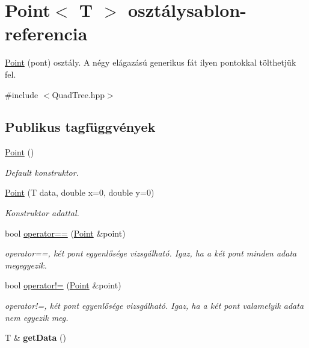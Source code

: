 \hypertarget{class_point}{\section{Point$<$ T $>$ osztálysablon-\/referencia}
\label{class_point}
}


\hyperlink{class_point}{Point} (pont) osztály. A négy elágazású generikus fát ilyen pontokkal tölthetjük fel.  




{\ttfamily \#include $<$Quad\-Tree.\-hpp$>$}

\subsection*{Publikus tagfüggvények}
\begin{DoxyCompactItemize}
\item 
\hypertarget{class_point_aea76b1130f1a203722d8f2254ced8e66}{\hyperlink{class_point_aea76b1130f1a203722d8f2254ced8e66}{Point} ()}\label{class_point_aea76b1130f1a203722d8f2254ced8e66}

\begin{DoxyCompactList}\small\item\em Default konstruktor. \end{DoxyCompactList}\item 
\hypertarget{class_point_a2305339234dc2f807f221ddcec4adf17}{\hyperlink{class_point_a2305339234dc2f807f221ddcec4adf17}{Point} (T data, double x=0, double y=0)}\label{class_point_a2305339234dc2f807f221ddcec4adf17}

\begin{DoxyCompactList}\small\item\em Konstruktor adattal. \end{DoxyCompactList}\item 
\hypertarget{class_point_a58360c2ad404143affafa09d1b512653}{bool \hyperlink{class_point_a58360c2ad404143affafa09d1b512653}{operator==} (\hyperlink{class_point}{Point} \&point)}\label{class_point_a58360c2ad404143affafa09d1b512653}

\begin{DoxyCompactList}\small\item\em operator==, két pont egyenlősége vizsgálható. Igaz, ha a két pont minden adata megegyezik. \end{DoxyCompactList}\item 
\hypertarget{class_point_aca0bf5d6cbf1b0e6a0c49ec44b4605e5}{bool \hyperlink{class_point_aca0bf5d6cbf1b0e6a0c49ec44b4605e5}{operator!=} (\hyperlink{class_point}{Point} \&point)}\label{class_point_aca0bf5d6cbf1b0e6a0c49ec44b4605e5}

\begin{DoxyCompactList}\small\item\em operator!=, két pont egyenlősége vizsgálható. Igaz, ha a két pont valamelyik adata nem egyezik meg. \end{DoxyCompactList}\item 
\hypertarget{class_point_ab012e5bfa40306e6d07abb3075e229ee}{T \& {\bfseries get\-Data} ()}\label{class_point_ab012e5bfa40306e6d07abb3075e229ee}

\end{DoxyCompactItemize}
